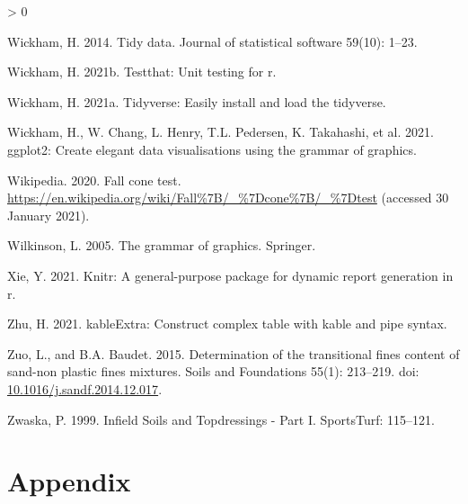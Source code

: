 \documentclass[
  letterpaper,
  openany]{book}
\newlength{\cslhangindent}
\newenvironment{CSLReferences}[2] %
 {%
  \setlength{\parindent}{0pt}
  \ifodd #1 \everypar{\setlength{\hangindent}{\cslhangindent}}\ignorespaces\fi
  \ifnum #2 > 0
  \setlength{\parskip}{#2\baselineskip}
  \fi
 }%
 {}
\begin{document}
\begin{CSLReferences}{1}{0}
\leavevmode\hypertarget{ref-Wickham2014}{}%
Wickham, H. 2014. {Tidy data}. Journal of statistical software 59(10): 1--23.

\leavevmode\hypertarget{ref-R-testthat}{}%
Wickham, H. 2021b. Testthat: Unit testing for r.

\leavevmode\hypertarget{ref-R-tidyverse}{}%
Wickham, H. 2021a. Tidyverse: Easily install and load the tidyverse.

\leavevmode\hypertarget{ref-R-ggplot2}{}%
Wickham, H., W. Chang, L. Henry, T.L. Pedersen, K. Takahashi, et al. 2021. ggplot2: Create elegant data visualisations using the grammar of graphics.

\leavevmode\hypertarget{ref-wikipediafallcone2021}{}%
Wikipedia. 2020. {Fall cone test}. \url{https://en.wikipedia.org/wiki/Fall\%7B/_\%7Dcone\%7B/_\%7Dtest} (accessed 30 January 2021).

\leavevmode\hypertarget{ref-Wilkinson2005}{}%
Wilkinson, L. 2005. {The grammar of graphics}. Springer.

\leavevmode\hypertarget{ref-R-knitr}{}%
Xie, Y. 2021. Knitr: A general-purpose package for dynamic report generation in r.

\leavevmode\hypertarget{ref-R-kableExtra}{}%
Zhu, H. 2021. kableExtra: Construct complex table with kable and pipe syntax.

\leavevmode\hypertarget{ref-Zuo2015}{}%
Zuo, L., and B.A. Baudet. 2015. {Determination of the transitional fines content of sand-non plastic fines mixtures}. Soils and Foundations 55(1): 213--219. doi: \href{https://doi.org/10.1016/j.sandf.2014.12.017}{10.1016/j.sandf.2014.12.017}.

\leavevmode\hypertarget{ref-Zwaska1999}{}%
Zwaska, P. 1999. {Infield Soils and Topdressings - Part I}. SportsTurf: 115--121.

\end{CSLReferences}

\hypertarget{appendix}{%
\chapter{Appendix}\label{appendix}}

\begingroup\fontsize{9}{11}\selectfont
\end{document}
